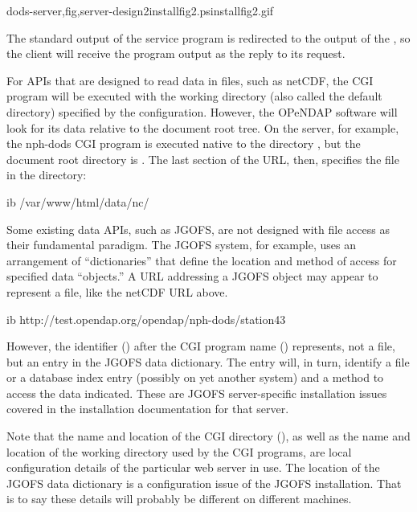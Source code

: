 \documentclass{dods-book}
\begin{document}
{dods-server,fig,server-design2}{installfig2.ps}{installfig2.gif}{}

The standard output of the service program is redirected to the output of
the , so the client will receive the program output as the
reply to its request.

For APIs that are designed to read data in files, such as netCDF, the
CGI program will be executed with the working directory (also called
the default directory) specified by the  configuration.
However, the OPeNDAP software will look for its data relative to the
document root tree.  On the  server, for
example, the nph-dods
CGI program is executed native to the directory
, but the document root directory
is .  The last section of the URL,
then, specifies the file  in the directory: 

\begin{vcode}{ib}
/var/www/html/data/nc/
\end{vcode}

Some existing data APIs, such as JGOFS, are not designed with file
access as their fundamental paradigm. The JGOFS system, for example,
uses an arrangement of ``dictionaries'' that define the location and
method of access for specified data ``objects.'' A URL addressing a
JGOFS object may appear to represent a file, like the netCDF URL
above. 

\begin{vcode}{ib}
http://test.opendap.org/opendap/nph-dods/station43
\end{vcode}

  However, the
identifier () after the CGI program name ()
represents, not a file, but an entry in the JGOFS data dictionary.
The entry will, in turn, identify a file or a database index entry
(possibly on yet another system) and a method to access the data
indicated.  These are JGOFS server-specific installation issues
covered in the installation documentation for that server.

Note that the name and location of the CGI directory (), as
well as the name and location of the working directory used by the CGI
programs, are local configuration details of the particular web server
in use. The location of the JGOFS data dictionary is a configuration
issue of the JGOFS installation. That is to say these details will
probably be different on different machines.
\end{document}
